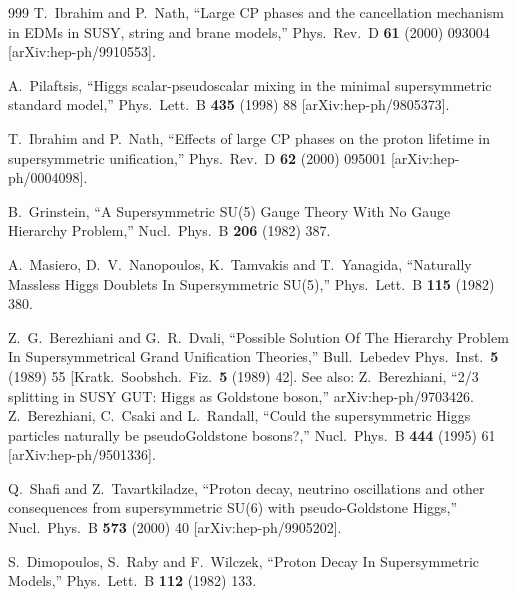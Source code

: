 \begin{thebibliography}{999}
  T.~Ibrahim and P.~Nath,
  ``Large CP phases and the cancellation mechanism in EDMs in SUSY, string  and
  brane models,''
  Phys.\ Rev.\ D {\bf 61} (2000) 093004
  [arXiv:hep-ph/9910553].

  A.~Pilaftsis,
  ``Higgs scalar-pseudoscalar mixing in the minimal supersymmetric standard
  model,''
  Phys.\ Lett.\ B {\bf 435} (1998) 88
  [arXiv:hep-ph/9805373].

  T.~Ibrahim and P.~Nath,
  ``Effects of large CP phases on the proton lifetime in supersymmetric
  unification,''
  Phys.\ Rev.\ D {\bf 62} (2000) 095001
  [arXiv:hep-ph/0004098].

  B.~Grinstein,
  ``A Supersymmetric SU(5) Gauge Theory With No Gauge Hierarchy Problem,''
  Nucl.\ Phys.\ B {\bf 206} (1982) 387.

  A.~Masiero, D.~V.~Nanopoulos, K.~Tamvakis and T.~Yanagida,
  ``Naturally Massless Higgs Doublets In Supersymmetric SU(5),''
  Phys.\ Lett.\ B {\bf 115} (1982) 380.

  Z.~G.~Berezhiani and G.~R.~Dvali,
  ``Possible Solution Of The Hierarchy Problem In Supersymmetrical Grand
  Unification Theories,''
  Bull.\ Lebedev Phys.\ Inst.\  {\bf 5} (1989) 55
  [Kratk.\ Soobshch.\ Fiz.\  {\bf 5} (1989) 42].
  See also: Z.~Berezhiani,
  ``2/3 splitting in SUSY GUT: Higgs as Goldstone boson,''
  arXiv:hep-ph/9703426.
  Z.~Berezhiani, C.~Csaki and L.~Randall,
  ``Could the supersymmetric Higgs particles naturally be pseudoGoldstone
  bosons?,''
  Nucl.\ Phys.\ B {\bf 444} (1995) 61
  [arXiv:hep-ph/9501336].

  Q.~Shafi and Z.~Tavartkiladze,
  ``Proton decay, neutrino oscillations and other consequences from
  supersymmetric SU(6) with pseudo-Goldstone Higgs,''
  Nucl.\ Phys.\ B {\bf 573} (2000) 40
  [arXiv:hep-ph/9905202].

  S.~Dimopoulos, S.~Raby and F.~Wilczek,
  ``Proton Decay In Supersymmetric Models,''
  Phys.\ Lett.\ B {\bf 112} (1982) 133.


\end{thebibliography}
